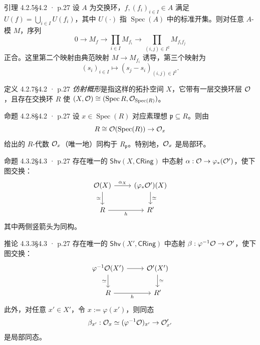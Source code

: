 \documentclass[UTF8,10pt,fontset=windows]{ctexart}
\newcommand{\Spec}{\operatorname{Spec}}\newcommand{\Spm}{\operatorname{Spm}}
\newcommand{\CRing}{\mathsf{CRing}}\newcommand{\Ring}{\mathsf{Ring}}
\newcommand{\Shv}{\mathsf{Shv}}\newcommand{\Mod}{\mathsf{Mod}}
\begin{document}
\begin{card}{引理 4.2.5}{§4.2 · p.27}
设 $A$ 为交换环，$f,(f_i)_{i \in I} \in A$ 满足 $U(f) = \bigcup_{i \in I} U(f_i)$，其中 $U(\cdot)$ 指 $\Spec(A)$ 中的标准开集。则对任意 $A$-模 $M$，序列
\[
0 \to M_f \to \prod_{i \in I} M_{f_i} \to \prod_{(i,j) \in I^2} M_{f_i f_j}
\]
正合。这里第二个映射由典范映射 $M \to M_{f_i}$ 诱导，第三个映射为
\[
(s_i)_{i \in I} \mapsto (s_j - s_i)_{(i,j) \in I^2}.
\]
\end{card}
\begin{card}{定义 4.2.7}{§4.2 · p.27}
\emph{仿射概形}是指这样的拓扑空间 $X$，它带有一层交换环层 $\mathcal{O}$，且存在交换环 $R$ 使 $(X,\cO) \cong (\Spec R, \cO_{\Spec(R)})$。
\end{card}
\begin{card}{命题 4.2.8}{§4.2 · p.27}
设 $x \in \Spec(R)$ 对应素理想 $\mathfrak p \subseteq R$。则由
\[
R \cong \cO(\Spec(R)) \to \cO_x
\]
给出的 $R$-代数 $\mathcal{O}_x$（唯一地）同构于 $R_{\mathfrak p}$。特别地，$\mathcal{O}_x$ 是局部环。
\end{card}
\begin{card}{命题 4.3.2}{§4.3 · p.27}
存在唯一的 $\Shv(X,\CRing)$ 中态射 $\alpha : \mathcal{O} \to \varphi_*(\mathcal{O}')$，使下图交换：
\[
\begin{tikzcd}
\cO(X) \arrow[r,"\alpha_X"] \arrow[d,"\simeq"'] & (\varphi_*\cO')(X) \arrow[d,"\simeq"] \\
R \arrow[r,"h"'] & R'
\end{tikzcd}
\]
其中两侧竖箭头为同构。
\end{card}
\begin{card}{推论 4.3.3}{§4.3 · p.27}
存在唯一的 $\Shv(X',\CRing)$ 中态射 $\beta : \varphi^{-1}\mathcal{O} \to \mathcal{O}'$，使下图交换：
\[
\begin{tikzcd}
\varphi^{-1}\cO(X') \arrow[r] \arrow[d,"\simeq"'] & \cO'(X') \arrow[d,"\simeq"] \\
R \arrow[r,"h"'] & R'
\end{tikzcd}
\]
此外，对任意 $x' \in X'$，令 $x := \varphi(x')$，则同态
\[
\beta_{x'} : \mathcal{O}_x \simeq (\varphi^{-1}\mathcal{O})_{x'} \to \mathcal{O}'_{x'}
\]
是局部同态。
\end{card}
\end{document}
